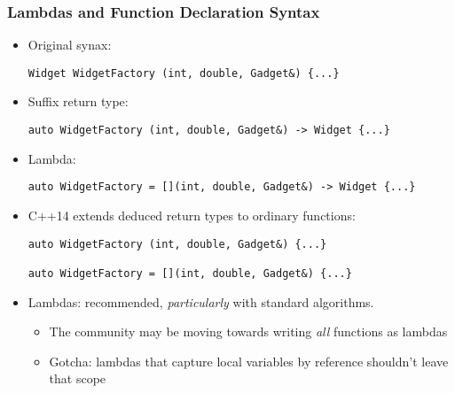 \begin{frame}[fragile,t]
\frametitle{Lambdas and Function Declaration Syntax}
\begin{itemize}
\item Original synax:
{\scriptsize\begin{verbatim}
Widget WidgetFactory (int, double, Gadget&) {...}
\end{verbatim}
}
\pause{}
\vskip 6pt
\item Suffix return type:
{\scriptsize\begin{verbatim}
auto WidgetFactory (int, double, Gadget&) -> Widget {...}
\end{verbatim}
}
\pause{}
\vskip 6pt
\item Lambda:
{\scriptsize\begin{verbatim}
auto WidgetFactory = [](int, double, Gadget&) -> Widget {...}
\end{verbatim}
}
\pause{}
\vskip 6pt
\item C++14 extends deduced return types to ordinary functions:
{\scriptsize\begin{verbatim}
auto WidgetFactory (int, double, Gadget&) {...}

auto WidgetFactory = [](int, double, Gadget&) {...}
\end{verbatim}
}
\vskip 12pt
\pause
\item Lambdas: recommended, \emph{particularly} with standard
  algorithms.
  \begin{itemize}
    \item The community may be moving towards writing \emph{all}
      functions as lambdas
    \item Gotcha: lambdas that capture local variables by reference
      shouldn't leave that scope
  \end{itemize}



\end{itemize}
\end{frame}


